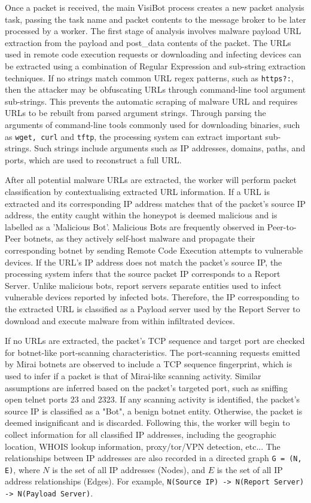 Once a packet is received, the main VisiBot process creates a new packet analysis task, passing the task name and packet contents to the message broker to be later processed by a worker. The first stage of analysis involves malware payload URL extraction from the payload and post\_data contents of the packet. The URLs used in remote code execution requests or downloading and infecting devices can be extracted using a combination of Regular Expression and sub-string extraction techniques. If no strings match common URL regex patterns, such as \texttt{https?:}, then the attacker may be obfuscating URLs through command-line tool argument sub-strings. This prevents the automatic scraping of malware URL and requires URLs to be rebuilt from parsed argument strings. Through parsing the arguments of command-line tools commonly used for downloading binaries, such as \texttt{wget, curl} and \texttt{tftp}, the processing system can extract important sub-strings. Such strings include arguments such as IP addresses, domains, paths, and ports, which are used to reconstruct a full URL.

After all potential malware URLs are extracted, the worker will perform packet classification by contextualising extracted URL information. If a URL is extracted and its corresponding IP address matches that of the packet's source IP address, the entity caught within the honeypot is deemed malicious and is labelled as a 'Malicious Bot'. Malicious Bots are frequently observed in Peer-to-Peer botnets, as they actively self-host malware and propagate their corresponding botnet by sending Remote Code Execution attempts to vulnerable devices. If the URL's IP address does not match the packet's source IP, the processing system infers that the source packet IP corresponds to a Report Server. Unlike malicious bots, report servers separate entities used to infect vulnerable devices reported by infected bots. Therefore, the IP corresponding to the extracted URL is classified as a Payload server used by the Report Server to download and execute malware from within infiltrated devices.

If no URLs are extracted, the packet's TCP sequence and target port are checked for botnet-like port-scanning characteristics. The port-scanning requests emitted by Mirai botnets are observed to include a TCP sequence fingerprint, which is used to infer if a packet is that of Mirai-like scanning activity. Similar assumptions are inferred based on the packet's targeted port, such as sniffing open telnet ports 23 and 2323. If any scanning activity is identified, the packet's source IP is classified as a "Bot", a benign botnet entity. Otherwise, the packet is deemed insignificant and is discarded. Following this, the worker will begin to collect information for all classified IP addresses, including the geographic location, WHOIS lookup information, proxy/tor/VPN detection, etc... The relationships between IP addresses are also recorded in a directed graph \texttt{G = (N, E)}, where $N$ is the set of all IP addresses (Nodes), and $E$ is the set of all IP address relationships (Edges). For example, \texttt{N(Source IP) -> N(Report Server) -> N(Payload Server)}.

